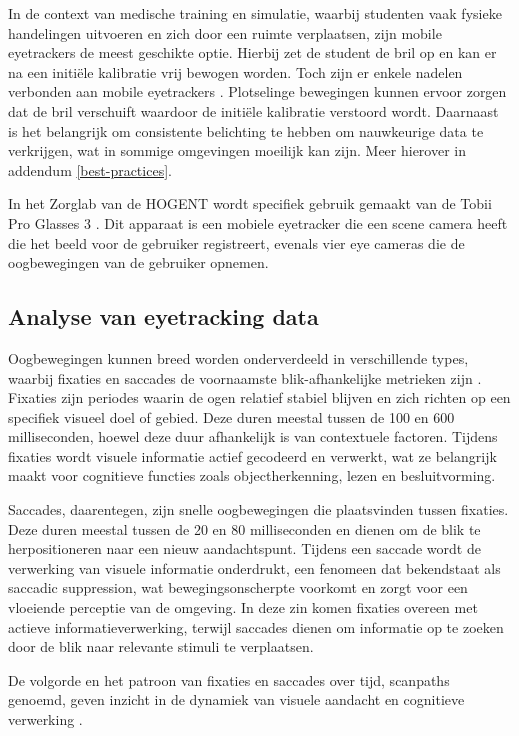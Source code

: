 In de context van medische training en simulatie, waarbij studenten vaak fysieke handelingen uitvoeren en zich door een ruimte verplaatsen, zijn mobile eyetrackers de meest geschikte optie.
Hierbij zet de student de bril op en kan er na een initiële kalibratie vrij bewogen worden.
Toch zijn er enkele nadelen verbonden aan mobile eyetrackers \autocite{PAUSZEK2023100031}. 
Plotselinge bewegingen kunnen ervoor zorgen dat de bril verschuift waardoor de initiële kalibratie verstoord wordt.
Daarnaast is het belangrijk om consistente belichting te hebben om nauwkeurige data te verkrijgen, wat in sommige omgevingen moeilijk kan zijn.
Meer hierover in addendum \ref{best-practices}.

In het Zorglab van de HOGENT wordt specifiek gebruik gemaakt van de Tobii Pro Glasses 3 \autocite{tobii_pro_glasses_3}. 
Dit apparaat is een mobiele eyetracker die een scene camera heeft die het beeld voor de gebruiker registreert, evenals vier eye cameras die de oogbewegingen van de gebruiker opnemen.

\subsection{Analyse van eyetracking data}

Oogbewegingen kunnen breed worden onderverdeeld in verschillende types, waarbij fixaties en saccades de voornaamste blik-afhankelijke metrieken zijn \autocite{PAUSZEK2023100031}.
Fixaties zijn periodes waarin de ogen relatief stabiel blijven en zich richten op een specifiek visueel doel of gebied.
Deze duren meestal tussen de 100 en 600 milliseconden, hoewel deze duur afhankelijk is van contextuele factoren.
Tijdens fixaties wordt visuele informatie actief gecodeerd en verwerkt, wat ze belangrijk maakt voor cognitieve functies zoals objectherkenning, lezen en besluitvorming.

Saccades, daarentegen, zijn snelle oogbewegingen die plaatsvinden tussen fixaties.
Deze duren meestal tussen de 20 en 80 milliseconden en dienen om de blik te herpositioneren naar een nieuw aandachtspunt.
Tijdens een saccade wordt de verwerking van visuele informatie onderdrukt, een fenomeen dat bekendstaat als saccadic suppression, wat bewegingsonscherpte voorkomt en zorgt voor een vloeiende perceptie van de omgeving.
In deze zin komen fixaties overeen met actieve informatieverwerking, terwijl saccades dienen om informatie op te zoeken door de blik naar relevante stimuli te verplaatsen.

De volgorde en het patroon van fixaties en saccades over tijd, scanpaths genoemd, geven inzicht in de dynamiek van visuele aandacht en cognitieve verwerking \autocite{PAUSZEK2023100031}.

